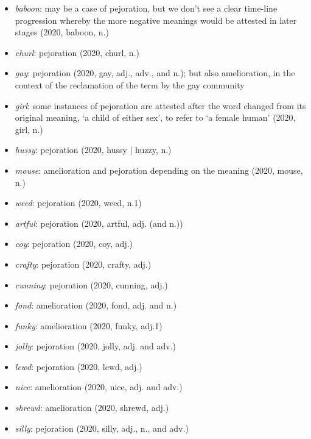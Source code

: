 \begin{itemize}
    \item \textit{baboon}: may be a case of pejoration, but we don't see a clear time-line progression whereby the more negative meanings would be attested in later stages (2020,  baboon, n.)
    \item \textit{churl}: pejoration (2020,  churl, n.)
    \item \textit{gay}: pejoration (2020,  gay, adj., adv., and n.); but also amelioration, in the context of the reclamation of the term by the gay community
    \item \textit{girl}: some instances of pejoration are attested after the word changed from its original meaning, `a child of either sex', to refer to `a female human' (2020,  girl, n.)
    \item \textit{hussy}: pejoration (2020,  hussy | huzzy, n.)
    \item \textit{mouse}: amelioration and pejoration depending on the meaning  (2020,  mouse, n.)
    \item \textit{weed}: pejoration (2020,  weed, n.1)
    \item \textit{artful}: pejoration (2020,  artful, adj. (and n.))
    \item \textit{coy}: pejoration (2020,  coy, adj.)
    \item \textit{crafty}: pejoration (2020,  crafty, adj.)
    \item \textit{cunning}: pejoration (2020,  cunning, adj.)
    \item \textit{fond}: amelioration (2020,  fond, adj. and n.)
    \item \textit{funky}: amelioration (2020,  funky, adj.1)
    \item \textit{jolly}: pejoration (2020,  jolly, adj. and adv.)
    \item \textit{lewd}: pejoration (2020,  lewd, adj.)
    \item \textit{nice}: amelioration (2020,  nice, adj. and adv.)
    \item \textit{shrewd}: amelioration (2020,  shrewd, adj.)
    \item \textit{silly}: pejoration (2020,  silly, adj., n., and adv.)

\end{itemize}
